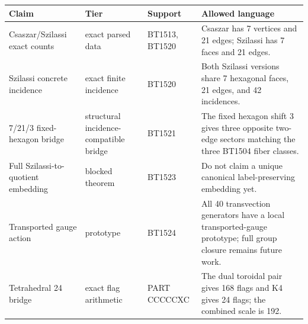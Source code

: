 \begin{center}\scriptsize
\begin{tabular}{p{}p{}p{}p{}}
\toprule
Claim & Tier & Support & Allowed language\\
\midrule
Csaszar/Szilassi exact counts & exact parsed data & BT1513, BT1520 & Csaszar has 7 vertices and 21 edges; Szilassi has 7 faces and 21 edges.\\
Szilassi concrete incidence & exact finite incidence & BT1520 & Both Szilassi versions share 7 hexagonal faces, 21 edges, and 42 incidences.\\
7/21/3 fixed-hexagon bridge & structural incidence-compatible bridge & BT1521 & The fixed hexagon shift 3 gives three opposite two-edge sectors matching the three BT1504 fiber classes.\\
Full Szilassi-to-quotient embedding & blocked theorem & BT1523 & Do not claim a unique canonical label-preserving embedding yet.\\
Transported gauge action & prototype & BT1524 & All 40 transvection generators have a local transported-gauge prototype; full group closure remains future work.\\
Tetrahedral 24 bridge & exact flag arithmetic & PART CCCCCXC & The dual toroidal pair gives 168 flags and K4 gives 24 flags; the combined scale is 192.\\
\bottomrule
\end{tabular}
\end{center}
